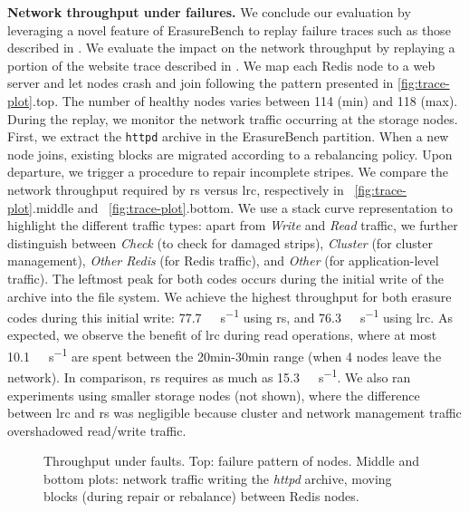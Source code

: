 \textbf{Network throughput under failures.}
\label{subsec:fault-trace}
We conclude our evaluation by leveraging a novel feature of ErasureBench to replay failure traces such as those described in \autocite{fta-journal}.
We evaluate the impact on the network throughput by replaying a portion of the website trace described in \autocite{websites02}.
We map each Redis node to a web server and let nodes crash and join following the pattern presented in \autoref{fig:trace-plot}.top. The number of healthy nodes varies between 114 (min) and 118 (max).
During the replay, we monitor the network traffic occurring at the storage nodes.
First, we extract the \texttt{httpd} archive in the ErasureBench partition.
When a new node joins, existing blocks are migrated according to a rebalancing policy.
Upon departure, we trigger a procedure to repair incomplete stripes.
We compare the network throughput required by \ac{rs} versus \ac{lrc}, respectively in ~\autoref{fig:trace-plot}.middle and ~\autoref{fig:trace-plot}.bottom.
We use a stack curve representation to highlight the different traffic types:  
apart from \textit{Write} and \textit{Read} traffic, we further distinguish between \textit{Check} (to check for damaged strips), \textit{Cluster} (for cluster management), \textit{Other Redis} (for Redis traffic), and \textit{Other} (for application-level traffic).
The leftmost peak for both codes occurs during the initial write of the archive into the file system. We achieve the highest throughput for both erasure codes during this initial write: \SI{77.7}{\mega\byte\per\second} using \ac{rs}, and \SI{76.3}{\mega\byte\per\second} using \ac{lrc}.
As expected, we observe the benefit of \ac{lrc} during read operations, where at most \SI{10.1}{\mega\byte\per\second} are spent between the 20min-30min range (when 4 nodes leave the network). In comparison, \ac{rs} requires as much as \SI{15.3}{\mega\byte\per\second}. We also ran experiments using smaller storage nodes (not shown), where the difference between \ac{lrc} and \ac{rs} was negligible because cluster and network management traffic overshadowed read/write traffic. 
   
\begin{figure}[ht]
    \centering
    
    \caption{Throughput under faults. Top: failure pattern of nodes. Middle and bottom plots: network traffic writing the \textit{httpd} archive, moving blocks (during repair or rebalance) between Redis nodes.}
    \label{fig:trace-plot}
	\vspace{-1.5mm}
\end{figure}
